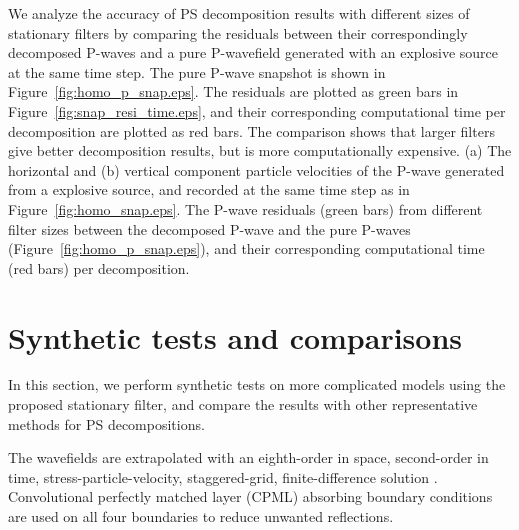 \documentclass[manuscript,ulem,graphix,revised]{geophysics}
\begin{document}
We analyze the accuracy of PS decomposition results with different sizes of stationary filters by comparing the residuals between their correspondingly decomposed P-waves and a pure P-wavefield generated with an explosive source at the same time step. The pure P-wave snapshot is shown in Figure~\ref{fig:homo_p_snap.eps}. 
The residuals are plotted as green bars in Figure~\ref{fig:snap_resi_time.eps}, and their corresponding computational time per decomposition are plotted as red bars. The comparison shows that larger filters give better decomposition results, but is more computationally expensive.
{
(a) The horizontal and (b) vertical component particle velocities of the P-wave generated from a explosive source, and recorded at the same time step as in Figure~\ref{fig:homo_snap.eps}.
}
{
The P-wave residuals (green bars) from different filter sizes between the decomposed P-wave and the pure P-waves (Figure~\ref{fig:homo_p_snap.eps}), and their corresponding computational time (red bars) per decomposition.
}

%
%
\section{Synthetic tests and comparisons}
\indent\indent
In this section, we perform synthetic tests on more complicated models using the proposed stationary filter, and compare the results with other representative methods for PS decompositions. 

The wavefields are extrapolated with an eighth-order in space, second-order in time, stress-particle-velocity, staggered-grid, finite-difference solution \citep{virieux86}. Convolutional perfectly matched layer (CPML) absorbing boundary conditions \citep{komatitsch07} are used on all four boundaries to reduce unwanted reflections. 
\end{document}
